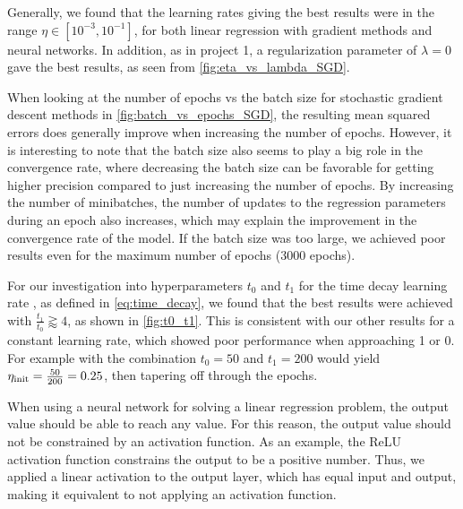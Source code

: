 \documentclass[12pt]{article}
\begin{document}
Generally, we found that the learning rates giving the best results were in the range $\eta \in \left[10^{-3}, 10^{-1}\right]$, for both linear regression with gradient methods and neural networks. In addition, as in project 1, a regularization parameter of $\lambda = 0$ gave the best results, as seen from \autoref{fig:eta_vs_lambda_SGD}.

When looking at the number of epochs vs the batch size for stochastic gradient descent methods in \autoref{fig:batch_vs_epochs_SGD}, the resulting mean squared errors does generally improve when increasing the number of epochs. However, it is interesting to note that the batch size also seems to play a big role in the convergence rate, where decreasing the batch size can be favorable for getting higher precision compared to just increasing the number of epochs. By increasing the number of minibatches, the number of updates to the regression parameters during an epoch also increases, which may explain the improvement in the convergence rate of the model. If the batch size was too large, we achieved poor results even for the maximum number of epochs (\num{3000} epochs). 

For our investigation into hyperparameters $t_0$ and $t_1$ for the time decay learning rate , as defined in \autoref{eq:time_decay}, we found that the best results were achieved with  $\frac{t_1}{t_0} \gtrapprox 4$, as shown in \autoref{fig:t0_t1}. This is consistent with our other results for a constant learning rate, which showed poor performance when approaching 1 or 0. For example with the combination $t_0 = 50$ and $t_1 = 200$ would yield $\eta_{\rm init} = \frac{50}{200} = 0.25$, then tapering off through the epochs.

When using a neural network for solving a linear regression problem, the output value should be able to reach any value. For this reason, the output value should not be constrained by an activation function. As an example, the ReLU activation function constrains the output to be a positive number. Thus, we applied a linear activation to the output layer, which has equal input and output, making it equivalent to not applying an activation function.
\end{document}
